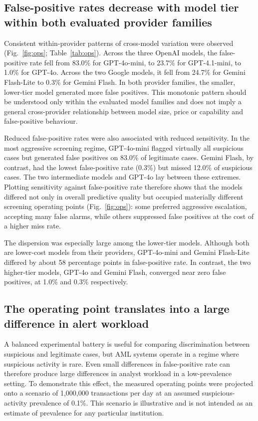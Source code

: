 \documentclass[pdflatex,sn-basic,Numbered]{sn-jnl}
\begin{document}
\subsection{False-positive rates decrease with model tier within both evaluated provider families}\label{sec:tier}

Consistent within-provider patterns of cross-model variation were observed (Fig.~\ref{fig:ops}; Table~\ref{tab:ops}). Across the three OpenAI models, the false-positive rate fell from 83.0\% for GPT-4o-mini, to 23.7\% for GPT-4.1-mini, to 1.0\% for GPT-4o. Across the two Google models, it fell from 24.7\% for Gemini Flash-Lite to 0.3\% for Gemini Flash. In both provider families, the smaller, lower-tier model generated more false positives. This monotonic pattern should be understood only within the evaluated model families and does not imply a general cross-provider relationship between model size, price or capability and false-positive behaviour.

Reduced false-positive rates were also associated with reduced sensitivity. In the most aggressive screening regime, GPT-4o-mini flagged virtually all suspicious cases but generated false positives on 83.0\% of legitimate cases. Gemini Flash, by contrast, had the lowest false-positive rate (0.3\%) but missed 12.0\% of suspicious cases. The two intermediate models and GPT-4o lay between these extremes. Plotting sensitivity against false-positive rate therefore shows that the models differed not only in overall predictive quality but occupied materially different screening operating points (Fig.~\ref{fig:ops}): some preferred aggressive escalation, accepting many false alarms, while others suppressed false positives at the cost of a higher miss rate.

The dispersion was especially large among the lower-tier models. Although both are lower-cost models from their providers, GPT-4o-mini and Gemini Flash-Lite differed by about 58 percentage points in false-positive rate. In contrast, the two higher-tier models, GPT-4o and Gemini Flash, converged near zero false positives, at 1.0\% and 0.3\% respectively.

\subsection{The operating point translates into a large difference in alert workload}\label{sec:volume}

A balanced experimental battery is useful for comparing discrimination between suspicious and legitimate cases, but AML systems operate in a regime where suspicious activity is rare. Even small differences in false-positive rate can therefore produce large differences in analyst workload in a low-prevalence setting. To demonstrate this effect, the measured operating points were projected onto a scenario of 1,000,000 transactions per day at an assumed suspicious-activity prevalence of 0.1\%. This scenario is illustrative and is not intended as an estimate of prevalence for any particular institution.
\end{document}
